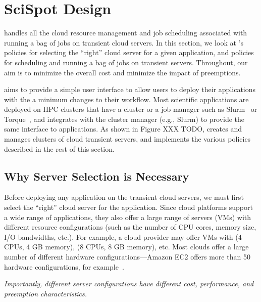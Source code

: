 \section{SciSpot Design}
\label{sec:design}

\sysname handles all the cloud resource management and job scheduling associated with running a bag of jobs on transient cloud servers. 
In this section, we look at \sysname's policies for selecting the ``right'' cloud server for a given application, and policies for scheduling and running a bag of jobs on transient servers.
Throughout, our aim is to minimize the overall cost and minimize the impact of preemptions. 


\sysname aims to provide a simple user interface to allow users to deploy their applications with the a minimum changes to their workflow.
Most scientific applications are deployed on HPC clusters that have a cluster or a job manager such as Slurm~\cite{slurm} or Torque~\cite{torque}, and \sysname integrates with the cluster manager (e.g., Slurm) to provide the same interface to applications.
As shown in Figure XXX TODO, \sysname creates and manages clusters of cloud transient servers, and implements the various policies described in the rest of this section. 


\subsection{Why Server Selection is Necessary}

Before deploying any application on the transient cloud servers, we must first select the ``right'' cloud server for the application. 
Since cloud platforms support a wide range of applications, they also offer a large range of servers (VMs) with different resource configurations (such as the number of CPU cores, memory size, I/O bandwidths, etc.). 
For example, a cloud provider may offer VMs with (4 CPUs, 4 GB memory), (8 CPUs, 8 GB memory), etc.
Most clouds offer a large number of different hardware configurations---Amazon EC2 offers more than 50 hardware configurations, for example~\cite{amazon-ec2-instance-types}. 

\noindent \emph{Importantly, different server configurations have different cost, performance, and preemption characteristics. }


